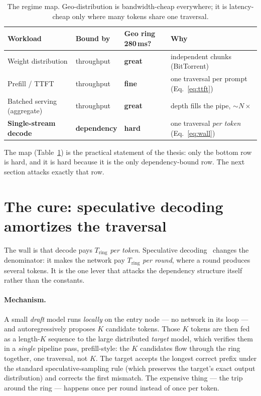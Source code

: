 \documentclass[11pt]{article}
\newcommand{\Tring}{\ensuremath{T_{\mathrm{ring}}}}
\begin{document}
\begin{table}[h]
\centering
\small
\caption{The regime map. Geo-distribution is bandwidth-cheap everywhere; it is latency-cheap only
where many tokens share one traversal.}
\label{tab:regime}
\begin{tabular}{l l l l}
\toprule
Workload & Bound by & Geo ring 280\,ms? & Why\\
\midrule
Weight distribution      & throughput & \textbf{great}     & independent chunks (BitTorrent)\\
Prefill / TTFT           & throughput & \textbf{fine}      & one traversal per prompt (Eq.~\ref{eq:ttft})\\
Batched serving (aggregate) & throughput & \textbf{great}  & depth fills the pipe, $\sim\!N\times$\\
\textbf{Single-stream decode} & \textbf{dependency} & \textbf{hard} & one traversal \emph{per token} (Eq.~\ref{eq:wall})\\
\bottomrule
\end{tabular}
\end{table}

The map (Table~\ref{tab:regime}) is the practical statement of the thesis: only the bottom row is
hard, and it is hard because it is the only dependency-bound row. The next section attacks exactly
that row.

\section{The cure: speculative decoding amortizes the traversal}
\label{sec:spec}

The wall is that decode pays $\Tring$ \emph{per token}. Speculative decoding~\cite{leviathan,chen}
changes the denominator: it makes the network pay $\Tring$ \emph{per round}, where a round produces
several tokens. It is the one lever that attacks the dependency structure itself rather than the
constants.

\paragraph{Mechanism.} A small \emph{draft} model runs \emph{locally} on the entry node --- no
network in its loop --- and autoregressively proposes $K$ candidate tokens. Those $K$ tokens are
then fed as a length-$K$ sequence to the large distributed \emph{target} model, which verifies them
in a \emph{single} pipeline pass, prefill-style: the $K$ candidates flow through the ring together,
one traversal, not $K$. The target accepts the longest correct prefix under the standard
speculative-sampling rule (which preserves the target's exact output distribution) and corrects the
first mismatch. The expensive thing --- the trip around the ring --- happens once per round instead
of once per token.
\end{document}
